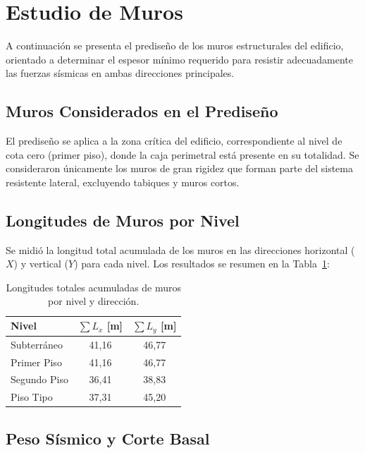 \section{Estudio de Muros}

A continuación se presenta el prediseño de los muros estructurales del 
edificio, orientado a determinar el espesor mínimo requerido para resistir 
adecuadamente las fuerzas sísmicas en ambas direcciones principales.

\subsection{Muros Considerados en el Prediseño}

El prediseño se aplica a la zona crítica del edificio, correspondiente al 
nivel de cota cero (primer piso), donde la caja perimetral está presente 
en su totalidad. Se consideraron únicamente los muros de gran rigidez que 
forman parte del sistema resistente lateral, excluyendo tabiques y muros cortos. 

\subsection{Longitudes de Muros por Nivel}

Se midió la longitud total acumulada de los muros en las direcciones 
horizontal ($X$) y vertical ($Y$) para cada nivel. Los resultados se 
resumen en la Tabla~\ref{tab:largos_muros}:

\begin{table}[H]
    \centering
    \begin{tabular}{lcc}
        \toprule
        \textbf{Nivel} & $\sum L_x$ \textbf{[m]} & $\sum L_y$ \textbf{[m]} \\
        \midrule
        Subterráneo  & 41{,}16 & 46{,}77 \\
        Primer Piso  & 41{,}16 & 46{,}77 \\
        Segundo Piso & 36{,}41 & 38{,}83 \\
        Piso Tipo    & 37{,}31 & 45{,}20 \\
        \bottomrule
    \end{tabular}
    \caption{Longitudes totales acumuladas de muros por nivel y dirección.}
    \label{tab:largos_muros}
\end{table}

\subsection{Peso Sísmico y Corte Basal}

